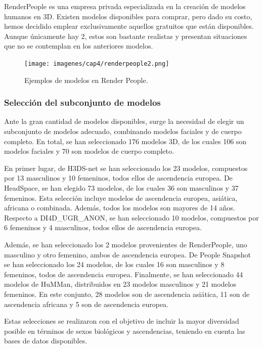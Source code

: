 RenderPeople es una empresa privada especializada en la creación de modelos humanos en 3D. Existen modelos disponibles para comprar, pero dado su costo, hemos decidido emplear exclusivamente aquellos gratuitos que están disponibles. Aunque únicamente hay 2, estos son bastante realistas y presentan situaciones que no se contemplan en los anteriores modelos.

\begin{figure}[h]
	\centering
	\texttt{[image: imagenes/cap4/renderpeople2.png]}
	\caption[Ejemplos Render People]{Ejemplos de modelos en Render People.}
	\label{fig21}
\end{figure}

\subsubsection{Selección del subconjunto de modelos}

Ante la gran cantidad de modelos disponibles, surge la necesidad de elegir un subconjunto de modelos adecuado, combinando modelos faciales y de cuerpo completo.
En total, se han seleccionado 176 modelos 3D, de los cuales 106 son modelos faciales y 70 son modelos de cuerpo completo.

En primer lugar, de H3DS-net se han seleccionado los 23 modelos, compuestos por 13 masculinos y 10 femeninos, todos ellos de ascendencia europea. 
De HeadSpace, se han elegido 73 modelos, de los cuales 36 son masculinos y 37 femeninos. Esta selección incluye modelos de ascendencia europea, asiática, africana o combinada. Además, todos los modelos son mayores de 14 años.
Respecto a DI4D\_UGR\_ANON, se han seleccionado 10 modelos, compuestos por 6 femeninos y 4 masculinos, todos ellos de ascendencia europea.

Además, se han seleccionado los 2 modelos provenientes de RenderPeople, uno masculino y otro femenino, ambos de ascendencia europea.
De People Snapshot se han seleccionado los 24 modelos, de los cuales 16 son masculinos y 8 femeninos, todos de ascendencia europea.
Finalmente, se han seleccionado 44 modelos de HuMMan, distribuidos en 23 modelos masculinos y 21 modelos femeninos. En este conjunto, 28 modelos son de ascendencia asiática, 11 son de ascendencia africana y 5 son de ascendencia europea.

Estas selecciones se realizaron con el objetivo de incluir la mayor diversidad posible en términos de sexos biológicos y ascendencias, teniendo en cuenta las bases de datos disponibles.

